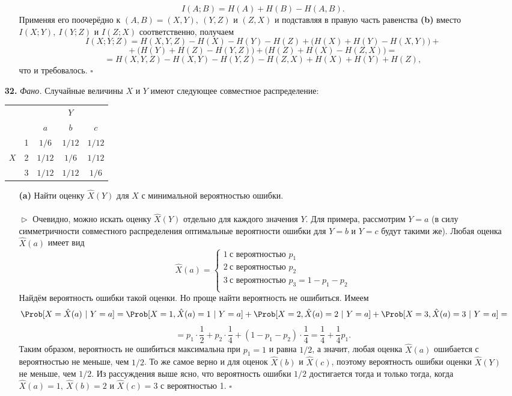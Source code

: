 \documentclass{article}
\begin{document}
\begin{enumerate}
\begin{enumerate}
$$I(A; B) = H(A) + H(B) - H(A, B).$$
Применяя его поочерёдно к $(A, B) = (X, Y),\ (Y, Z)$ и $(Z, X)$ и подставляя в правую часть равенства {\bfseries (b)} вместо $I(X; Y),\ I(Y; Z)$ и $I(Z; X)$ соответственно, получаем
$$I(X; Y; Z) = H(X, Y, Z) - H(X) - H(Y) - H(Z) + \Big(H(X) + H(Y) - H(X, Y)\Big) +$$
$$+\ \Big(H(Y) + H(Z) - H(Y, Z)\Big) + \Big(H(Z) + H(X) - H(Z, X)\Big) = $$
$$= H(X, Y, Z) - H(X, Y) - H(Y, Z) - H(Z, X) + H(X) + H(Y) + H(Z),$$
что и требовалось. $\square$
\\
\end{enumerate}
\item[\bfseries 32.] \textit{Фано.} Случайные величины $X$ и $Y$ имеют следующее совместное распределение:
\begin{center}
\begin{tabular}{ c c | c c c}
& & & $Y$ & \\
& & $a$ & $b$ & $c$\\ \hline
& 1 & $1/6$ & $1/12$ & $1/12$ \\
$X$ & 2& $1/12$ & $1/6$ & $1/12$\\
& 3 & $1/12$ & $1/12$ & $1/6$\\
\end{tabular}
\end{center}
\begin{enumerate}
\item[\bfseries (a)] Найти оценку $\hat X(Y)$ для $X$ с минимальной вероятностью ошибки.
\\\\$\vartriangleright$ Очевидно, можно искать оценку $\hat X(Y)$ отдельно для каждого значения $Y$. Для примера, рассмотрим $Y = a$ (в силу симметричности совместного распределения оптимальные вероятности ошибки для $Y = b$ и $Y = c$ будут такими же). Любая оценка $\hat X(a)$ имеет вид 
$$\hat X(a) = 
\begin{cases}
1\ \text{с вероятностью } p_1\\
2\ \text{с вероятностью } p_2\\
3\ \text{с вероятностью } p_3 = 1 - p_1 - p_2\\
\end{cases}$$
Найдём вероятность ошибки такой оценки. Но проще найти вероятность не ошибиться. Имеем 
$$\Prob[X = \hat X(a)\ |\ Y = a] = \Prob[X = 1, \hat X(a) = 1\ |\ Y = a] + \Prob[X = 2, \hat X(a) = 2\ |\ Y = a] + \Prob[X = 3, \hat X(a) = 3\ |\ Y = a] =$$
$$= p_1 \cdot \frac{1}{2} + p_2 \cdot \frac{1}{4} + (1 - p_1 - p_2) \cdot \frac{1}{4} = \frac{1}{4} + \frac{1}{4}p_1.$$
Таким образом, вероятность не ошибиться максимальна при $p_1 = 1$ и равна $1/2$, а значит, любая оценка $\hat X(a)$ ошибается с вероятностью не меньше, чем $1/2$. То же самое верно и для оценок $\hat X(b)$ и $\hat X(c)$, поэтому вероятность ошибки оценки $\hat X(Y)$ не меньше, чем $1/2.$ Из рассуждения выше ясно, что вероятность ошибки $1/2$ достигается тогда и только тогда, когда $\hat X(a) = 1,\ \hat X(b) = 2$ и $\hat X(c) = 3$ с вероятностью 1. $\square$

\end{enumerate}
\end{enumerate}
\end{document}
